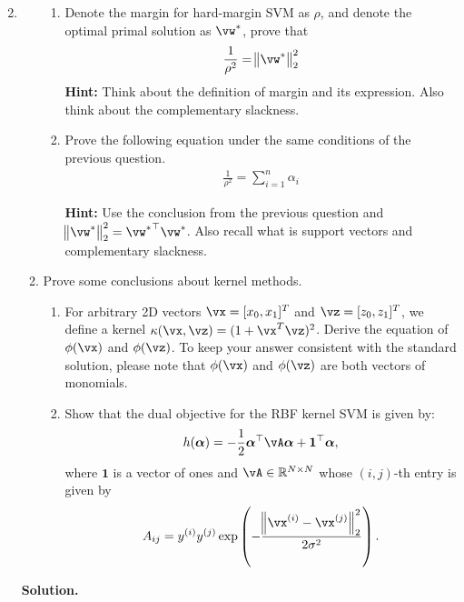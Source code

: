 \documentclass{article}
\def\b1{\boldsymbol{1}}
\def\balpha{\boldsymbol{\alpha}}
\theoremstyle{definition}
\theoremstyle{remark}
\newenvironment{Q}
{%
\clearpage
\item
}
{%
\phantom{s} %
\bigskip
\textbf{Solution.}
}
\begin{document}
\begin{enumerate}[font={\Large\bfseries},left=0pt]
\begin{Q}
\begin{enumerate}
        \begin{enumerate}
            \item Denote the margin for hard-margin SVM as $\rho$, and denote the optimal primal solution as $\vw^*$, prove that 
            \begin{align*}
                \frac{1}{\rho^2}=\enVert{\vw^*}^2_2
            \end{align*}
            \textbf{Hint:} Think about the definition of margin and its expression. Also think about the complementary slackness. %
            \item Prove the following equation under the same conditions of the previous question. 
            \begin{align*}
                \frac{1}{\rho^2}=\sum_{i=1}^n\alpha_i
            \end{align*}
            
            \textbf{Hint:} Use the conclusion from the previous question and $\enVert{\vw^*}^2_2={\vw^*}^\top\vw^*$. Also recall what is support vectors and complementary slackness.
            

        \end{enumerate}
        
        \item Prove some conclusions about kernel methods.
        \begin{enumerate}
            \item For arbitrary 2D vectors $\vx=[x_0, x_1]^T$ and $\vz=[z_0, z_1]^T$, we define a kernel $\kappa(\vx, \vz)=(1+\vx^T\vz)^2$. Derive the equation of $\phi(\vx)$ and $\phi(\vz)$. To keep your answer consistent with the standard solution, please note that $\phi(\vx)$ and $\phi(\vz)$ are both vectors of monomials.
            


            \item Show that the dual objective for the RBF kernel SVM is given by:
            \begin{align*}
                h(\balpha)=-\frac{1}{2}\balpha^{\top}\vA\balpha+\b1^{\top}\balpha,
            \end{align*}
            where $\b1$ is a vector of ones and $\vA\in \mathbb{R}^{N\times N}$ whose $(i,j)$-th entry is given by
            \begin{align*}\label{eq:gram}
                A_{ij}=y^{(i)}y^{(j)}\exp\del{-\frac{\enVert{\vx^{(i)}-\vx^{(j)}}_2^2}{2\sigma^2}}.
            \end{align*}
            

\end{enumerate}
\end{enumerate}
\end{Q}
\end{enumerate}
\end{document}
